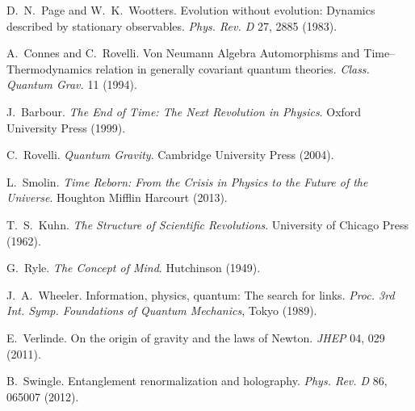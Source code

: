 \documentclass[11pt]{article}
\theoremstyle{definition}
\theoremstyle{plain}
\theoremstyle{remark}
\begin{document}

\begin{thebibliography}{20}

D.~N.~Page and W.~K.~Wootters.
\newblock Evolution without evolution: Dynamics described by stationary observables.
\newblock \emph{Phys. Rev. D} 27, 2885 (1983).

A.~Connes and C.~Rovelli.
\newblock Von Neumann Algebra Automorphisms and Time–Thermodynamics relation in generally covariant quantum theories.
\newblock \emph{Class. Quantum Grav.} 11 (1994).

J.~Barbour.
\newblock \emph{The End of Time: The Next Revolution in Physics}.
\newblock Oxford University Press (1999).

C.~Rovelli.
\newblock \emph{Quantum Gravity}.
\newblock Cambridge University Press (2004).

L.~Smolin.
\newblock \emph{Time Reborn: From the Crisis in Physics to the Future of the Universe}.
\newblock Houghton Mifflin Harcourt (2013).

T.~S.~Kuhn.
\newblock \emph{The Structure of Scientific Revolutions}.
\newblock University of Chicago Press (1962).

G.~Ryle.
\newblock \emph{The Concept of Mind}.
\newblock Hutchinson (1949).

J.~A.~Wheeler.
\newblock Information, physics, quantum: The search for links.
\newblock \emph{Proc. 3rd Int. Symp. Foundations of Quantum Mechanics}, Tokyo (1989).

E.~Verlinde.
\newblock On the origin of gravity and the laws of Newton.
\newblock \emph{JHEP} 04, 029 (2011).

B.~Swingle.
\newblock Entanglement renormalization and holography.
\newblock \emph{Phys. Rev. D} 86, 065007 (2012).

\end{thebibliography}
\end{document}
